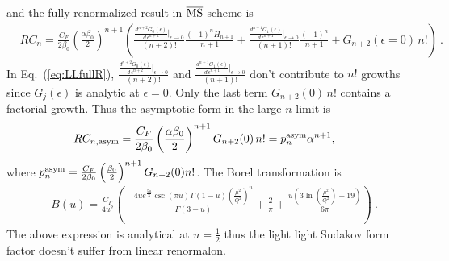 \documentclass[a4paper,11pt]{article}
\begin{document}
and the fully renormalized result in $\overline{\rm MS}$ scheme is
\begin{align}\label{eq:LLfullR}
    &RC_n =\frac{C_F}{2\beta_0} \left( \frac{\alpha\beta_0}{2}\right)^{n+1} \left( \frac{ \frac{d^{n+2}G_0(\epsilon)}{d \, \epsilon^{n+2}} |_{\epsilon \rightarrow 0}}{(n+2)!} \frac{(-1)^n H_{n+1}}{n+1} + \frac{ \frac{d^{n+1}G_1(\epsilon)}{d \, \epsilon^{n+1}} |_{\epsilon \rightarrow 0}}{(n+1)!} \frac{(-1)^n}{n+1} + G_{n+2}(\epsilon=0) \, n! \right) \ .
\end{align}
In Eq.~(\ref{eq:LLfullR}), $\frac{ \frac{d^{n+2}G_0(\epsilon)}{d \, \epsilon^{n+2}} |_{\epsilon \rightarrow 0}}{(n+2)!}$ and $\frac{ \frac{d^{n+1}G_1(\epsilon)}{d \, \epsilon^{n+1}} |_{\epsilon \rightarrow 0}}{(n+1)!}$ don't contribute to $n!$ growths since $G_j(\epsilon )$ is analytic at $\epsilon=0$. Only the last term $G_{n+2}(0) \, n!$ contains a factorial growth. Thus the asymptotic form in the large $n$ limit is
\begin{align}
    RC_{n,{\rm asym}} &= \frac{C_F}{2\beta_0} \left( \frac{\alpha\beta_0}{2}\right)^{n+1} G_{n+2}(0) \, n! = p^{\rm asym}_n \alpha^{n+1},
\end{align}
where $p^{\rm asym}_n = \frac{C_F}{2\beta_0} \left( \frac{\beta_0}{2}\right)^{n+1} G_{n+2}(0) n!$. The Borel transformation is
\begin{align}
   &B(u) = \frac{C_F}{4u^2} \left( -\frac{4ue^{\frac{5 u}{3}} \csc \left(\pi u\right) \Gamma \left(1-u\right) \left(\frac{\mu
   ^2}{Q^2}\right)^{u}}{\Gamma \left(3-u\right)} + \frac{2}{\pi } + \frac{u\left(3 \ln \left(\frac{\mu ^2}{Q^2}\right)+19\right)}{6 \pi }  \right) \ .
\end{align}
The above expression is analytical at $u=\frac{1}{2}$ thus the light light Sudakov form factor doesn't suffer from linear renormalon. 
\end{document}
